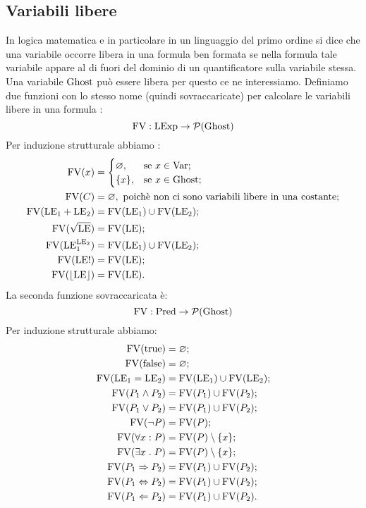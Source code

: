 \subsection{Variabili libere}
In logica matematica e in particolare in un linguaggio del primo ordine si dice che una variabile occorre libera in una formula ben formata se nella formula tale variabile appare al di fuori del dominio di un quantificatore sulla variabile stessa. Una variabile $\mathrm{Ghost}$ può essere libera per questo ce ne interessiamo.
Definiamo due funzioni con lo stesso nome (quindi sovraccaricate) per calcolare le variabili libere in una formula :
\[
   \mathrm{FV}\mathrel{:}\mathrm{LExp} \rightarrow \mathcal{P}(\mathrm{Ghost})
\]
Per induzione strutturale abbiamo :
\begin{align*}
   \mathrm{FV}(x)
      &=
        \begin{cases}
            \varnothing,&\text{se $x  \in \mathrm{Var}$};\\
            \{x\},    &\text{se $x  \in \mathrm{Ghost}$};
        \end{cases} \\
   \mathrm{FV}( C)
      &= \varnothing,\text{ poichè non ci sono variabili libere in una costante};\\
   \mathrm{FV}(\mathrm{LE}_1 + \mathrm{LE}_2)
      &= \mathrm{FV}(\mathrm{LE}_1) \cup \mathrm{FV}(\mathrm{LE}_2);\\
   \mathrm{FV}(\sqrt{\mathrm{LE}})
      &= \mathrm{FV}(\mathrm{LE});\\
   \mathrm{FV}(\mathrm{LE}_1^{\mathrm{LE}_2})
      &= \mathrm{FV}(\mathrm{LE}_1) \cup \mathrm{FV}(\mathrm{LE}_2);\\
   \mathrm{FV}(\mathrm{LE}!)
      &= \mathrm{FV}(\mathrm{LE});\\
   \mathrm{FV}(\lfloor \mathrm{LE} \rfloor)
      &= \mathrm{FV}(\mathrm{LE}).
\end{align*}
La seconda funzione sovraccaricata è:
\[
\mathrm{FV}\mathrel{:}\mathrm{Pred}\rightarrow\mathcal{P}(\mathrm{Ghost})
\]
Per induzione strutturale abbiamo:
\begin{align*}
   \mathrm{FV}(\mathrm{true})
      &= \varnothing;\\
   \mathrm{FV}(\mathrm{false})
      &= \varnothing;\\
   \mathrm{FV}(\mathrm{LE}_1 = \mathrm{LE}_2)
      &= \mathrm{FV}(\mathrm{LE}_1) \cup \mathrm{FV}(\mathrm{LE}_2);\\
   \mathrm{FV}(P_1 \land P_2)
      &= \mathrm{FV}(P_1) \cup \mathrm{FV}(P_2);\\
   \mathrm{FV}(P_1 \lor P_2)
      &= \mathrm{FV}(P_1) \cup \mathrm{FV}(P_2);\\
   \mathrm{FV}(\neg P)
      &= \mathrm{FV}(P);\\
   \mathrm{FV}(\forall x \mathrel{:} P)
      &= \mathrm{FV}(P)\setminus \{x\};\\
   \mathrm{FV}(\exists x \mathrel{.} P)
      &= \mathrm{FV}(P)\setminus \{x\};\\
   \mathrm{FV}(P_1 \Rightarrow P_2)
      &= \mathrm{FV}(P_1) \cup \mathrm{FV}(P_2);\\
   \mathrm{FV}(P_1 \Leftrightarrow P_2)
      &= \mathrm{FV}(P_1) \cup \mathrm{FV}(P_2);\\
   \mathrm{FV}(P_1 \Leftarrow P_2)
      &= \mathrm{FV}(P_1) \cup \mathrm{FV}(P_2).
\end{align*}
